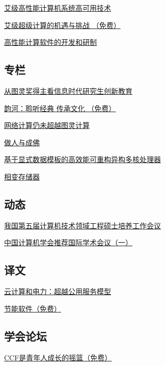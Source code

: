 \documentclass[a4paper]{article}
\begin{document}
\href{http://history.ccf.org.cn/resources/1190201776262/2010/10/20/zhuanti-5.pdf}{艾级高性能计算机系统高可用技术}

\href{http://history.ccf.org.cn/resources/1190201776262/2010/10/20/zhuanti-1.pdf}{艾级超级计算的机遇与挑战 （免费）}

\href{http://history.ccf.org.cn/resources/1190201776262/2010/10/20/zhuanti-2.pdf}{高性能计算软件的开发和研制}

\subsection{专栏}
\href{http://history.ccf.org.cn/resources/1190201776262/2010/10/20/zhuanlan-6.pdf}{从图灵奖得主看信息时代研究生创新教育}

\href{http://history.ccf.org.cn/resources/1190201776262/2010/10/20/zhuanlan-1.pdf}{韵河：聆听经典 传承文化 （免费）}

\href{http://history.ccf.org.cn/resources/1190201776262/2010/10/20/zhuanlan-2.pdf}{网络计算仍未超越图灵计算}

\href{http://history.ccf.org.cn/resources/1190201776262/2010/10/20/zhuanlan-5.pdf}{做人与成佛}

\href{http://history.ccf.org.cn/resources/1190201776262/2010/10/20/zhuanlan-3.pdf}{基于显式数据模板的高效能可重构异构多核处理器}

\href{http://history.ccf.org.cn/resources/1190201776262/2010/10/20/zhuanlan-4.pdf}{相变存储器}

\subsection{动态}
\href{http://history.ccf.org.cn/resources/1190201776262/2010/10/20/dongtai-1.pdf}{我国第五届计算机技术领域工程硕士培养工作会议}

\href{http://history.ccf.org.cn/resources/1190201776262/2010/10/20/dongtai-2.pdf}{中国计算机学会推荐国际学术会议（一）}

\subsection{译文}
\href{http://history.ccf.org.cn/resources/1190201776262/2010/10/20/yiwen-2.pdf}{云计算和电力：超越公用服务模型}

\href{http://history.ccf.org.cn/resources/1190201776262/2010/10/20/yiwen-1.pdf}{节能软件（免费）}

\subsection{学会论坛}
\href{http://history.ccf.org.cn/resources/1190201776262/2010/10/20/xuehuiluntan-2.pdf}{CCF是青年人成长的摇篮（免费）}
\end{document}
